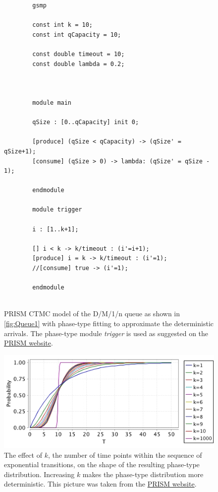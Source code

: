 \documentclass[paper=a4, fontsize=11pt]{scrartcl}
\numberwithin{equation}{section}		%
\numberwithin{figure}{section}			%
\numberwithin{table}{section}				%
\begin{document}
	\begin{figure}
		\centering
		\begin{lstlisting}
		gsmp
		
		const int k = 10;
		const int qCapacity = 10;
		
		const double timeout = 10;
		const double lambda = 0.2;
		
		
		
		module main
		
		qSize : [0..qCapacity] init 0;
		
		[produce] (qSize < qCapacity) -> (qSize' = qSize+1);
		[consume] (qSize > 0) -> lambda: (qSize' = qSize - 1);
		
		endmodule
		
		module trigger
		
		i : [1..k+1];
		
		[] i < k -> k/timeout : (i'=i+1);
		[produce] i = k -> k/timeout : (i'=1);
		//[consume] true -> (i'=1);
		
		endmodule
		
		\end{lstlisting}
		\caption{PRISM CTMC model of the D/M/1/n queue as shown in \ref{fig:Queue1} with phase-type fitting to approximate the deterministic arrivals. The phase-type module \emph{trigger} is used as suggested on the \href{http://www.prismmodelchecker.org/manual/FrequentlyAskedQuestions/PRISMModelling}{PRISM website}.  }
		\label{fig:queuecode2}
	\end{figure}
	
	\begin{figure}
		\centering
		\includegraphics[width=12cm]{faq-erlang.jpg}
		\caption{The effect of $k$, the number of time points within the sequence of exponential transitions, on the shape of the resulting phase-type distribution. Increasing $k$ makes the phase-type distribution more deterministic. This picture was taken from the \href{http://www.prismmodelchecker.org/manual/FrequentlyAskedQuestions/PRISMModelling}{PRISM website}.}
		\label{fig:time1}
	\end{figure}
	
\end{document}

